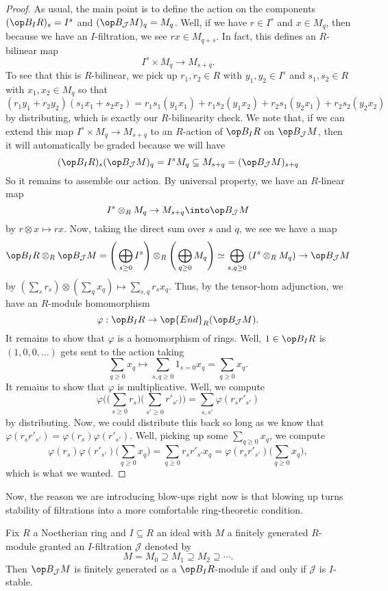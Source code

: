 \begin{proof}
	As usual, the main point is to define the action on the components $(\op B_IR)_s=I^s$ and $(\op B_\mathcal JM)_q=M_q$. Well, if we have $r\in I^s$ and $x\in M_q$, then because we have an $I$-filtration, we see $rx\in M_{q+s}$. In fact, this defines an $R$-bilinear map
	\[I^s\times M_q\to M_{s+q}.\]
	To see that this is $R$-bilinear, we pick up $r_1,r_2\in R$ with $y_1,y_2\in I^s$ and $s_1,s_2\in R$ with $x_1,x_2\in M_q$ so that
	\[(r_1y_1+r_2y_2)(s_1x_1+s_2x_2)=r_1s_1(y_1x_1)+r_1s_2(y_1x_2)+r_2s_1(y_2x_1)+r_2s_2(y_2x_2)\]
	by distributing, which is exactly our $R$-bilinearity check. We note that, if we can extend this map $I^s\times M_q\to M_{s+q}$ to an $R$-action of $\op B_IR$ on $\op B_\mathcal JM$, then it will automatically be graded because we will have
	\[(\op B_IR)_s(\op B_\mathcal JM)_q=I^sM_q\subseteq M_{s+q}=(\op B_\mathcal JM)_{s+q}\]
	So it remains to assemble our action. By universal property, we have an $R$-linear map
	\[I^s\otimes_RM_q\to M_{s+q}\into\op B_\mathcal JM\]
	by $r\otimes x\mapsto rx$. Now, taking the direct sum over $s$ and $q$, we see we have a map
	\[\op B_IR\otimes_R\op B_\mathcal JM=\Bigg(\bigoplus_{s\ge0}I^s\Bigg)\otimes_R\Bigg(\bigoplus_{q\ge0}M_q\Bigg)\simeq\bigoplus_{s,q\ge0}\left(I^s\otimes_RM_q\right)\to\op B_\mathcal JM\]
	by $\left(\sum_sr_s\right)\otimes\left(\sum_qx_q\right)\mapsto\sum_{s,q}r_sx_q$. Thus, by the tensor-hom adjunction, we have an $R$-module homomorphism
	\[\varphi:\op B_IR\to\op{End}_R(\op B_\mathcal JM).\]
	It remains to show that $\varphi$ is a homomorphism of rings. Well, $1\in\op B_IR$ is $(1,0,0,\ldots)$ gets sent to the action taking
	\[\sum_{q\ge0}x_q\mapsto\sum_{s,q\ge0}1_{s=0}x_q=\sum_{q\ge0}x_q.\]
	It remains to show that $\varphi$ is multiplicative. Well, we compute
	\[\varphi\Bigg(\Bigg(\sum_{s\ge0}r_s\Bigg)\Bigg(\sum_{s'\ge0}r'_{s'}\Bigg)\Bigg)=\sum_{s,s'}\varphi(r_sr'_{s'})\]
	by distributing. Now, we could distribute this back so long as we know that $\varphi(r_sr'_{s'})=\varphi(r_s)\varphi(r'_{s'})$. Well, picking up some $\sum_{q\ge0}x_q$, we compute
	\[\varphi(r_s)\varphi(r'_{s'})\Bigg(\sum_{q\ge0}x_q\Bigg)=\sum_{q\ge0}r_sr'_{s'}x_q=\varphi(r_sr'_{s'})\Bigg(\sum_{q\ge0}x_q\Bigg),\]
	which is what we wanted.
\end{proof}
Now, the reason we are introducing blow-ups right now is that blowing up turns stability of filtrations into a more comfortable ring-theoretic condition.
\begin{proposition} \label{prop:stabilityisfingen}
	Fix $R$ a Noetherian ring and $I\subseteq R$ an ideal with $M$ a finitely generated $R$-module granted an $I$-filtration $\mathcal J$ denoted by
	\[M=M_0\supseteq M_1\supseteq M_2\supseteq\cdots.\]
	Then $\op B_\mathcal JM$ is finitely generated as a $\op B_IR$-module if and only if $\mathcal J$ is $I$-stable.
\end{proposition}
